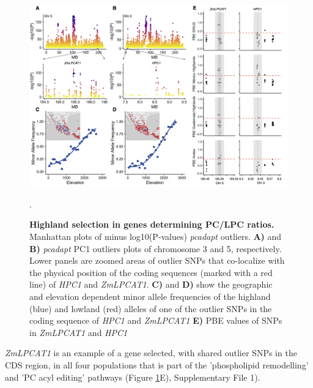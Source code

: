 \documentclass[9pt,twocolumn,twoside,lineno]{BioRxiv}
\begin{document}
\begin{figure}[h]
\begin{center}
\includegraphics[width=0.6\paperwidth]{Figures/Fig_2.png}
\caption{\textbf{Highland selection in genes determining PC/LPC ratios.}
Manhattan plots of minus log10(P‐values) \textit{pcadapt} outliers. 
\textbf{A)} and \textbf{B)} \textit{pcadapt} PC1 outliers plots of chromosome 3 and 5, respectively. 
Lower panels are zoomed areas of outlier SNPs that co-localize with the physical position of the coding sequences (marked with a red line) of \textit{HPC1} and \textit{ZmLPCAT1}. 
\textbf{C)} and \textbf{D)} show the geographic and elevation dependent minor allele frequencies of the highland (blue) and lowland (red) alleles of one of the outlier SNPs in the coding sequence of \textit{HPC1} and \textit{ZmLPCAT1}
\textbf{E)} PBE values of SNPs in \textit{ZmLPCAT1} and \textit{HPC1}}. 
\label{Fig2}
\end{center}
\end{figure} 
\textit{ZmLPCAT1} is an example of a gene selected, with shared outlier SNPs in the CDS region, in all four populations that is part of the 'phospholipid remodelling' and 'PC acyl editing' pathways (Figure \ref{Fig2}E), Supplementary File 1). %
\end{document}
